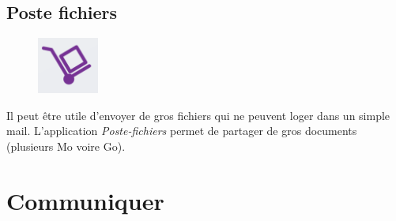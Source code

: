 \documentclass[a4paper,11pt]{article}
\begin{document}
\begin{Form}
\subsection{Poste fichiers}
\begin{figure}[!h]
\centering
\includegraphics[width=2cm]{ressources/poste.png}
\label{poste}
\end{figure}
Il peut être utile d'envoyer de gros fichiers qui ne peuvent loger dans un simple mail. L'application \emph{Poste-fichiers} permet de partager de gros documents (plusieurs Mo voire Go).

\section{Communiquer}

\end{Form}
\end{document}
